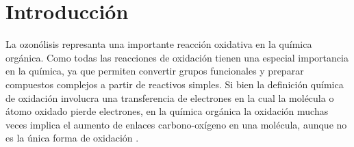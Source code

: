 \documentclass[fleqn,10pt]{SelfArx}
\begin{document}
\flushbottom %

\maketitle %


\thispagestyle{empty} %




\section*{Introducci\'on} %
La ozon\'olisis represanta una importante reacci\'on oxidativa en la qu\'imica org\'anica. Como todas las reacciones de oxidaci\'on tienen una especial importancia en la qu\'imica, ya que permiten convertir grupos funcionales y preparar compuestos complejos a partir de reactivos simples. Si bien la definici\'on qu\'imica de oxidaci\'on involucra una transferencia de electrones en la cual la mol\'ecula o \'atomo oxidado pierde electrones, en la qu\'imica org\'anica la oxidaci\'on muchas veces implica el aumento de enlaces carbono-ox\'igeno en una mol\'ecula, aunque no es la \'unica forma de oxidaci\'on \cite{Gilbert2010}.
\end{document}
